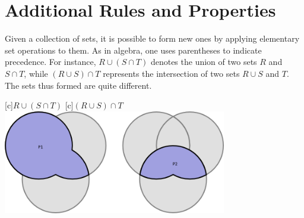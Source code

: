 \section{Additional Rules and Properties}

Given a collection of sets, it is possible to form new ones by applying elementary set operations to them.
As in algebra, one uses parentheses to indicate precedence.
For instance, $R \cup (S \cap T)$ denotes the union of two sets $R$ and $S \cap T$, while $(R \cup S) \cap T$ represents the intersection of two sets $R \cup S$ and $T$.
The sets thus formed are quite different.

\begin{center}
\begin{psfrags}
[c]{$R \cup (S \cap T)$}
[c]{$(R \cup S) \cap T$}
\includegraphics[height=4.53cm]{Figures/1Chapter/triple}
\end{psfrags}
\end{center}

